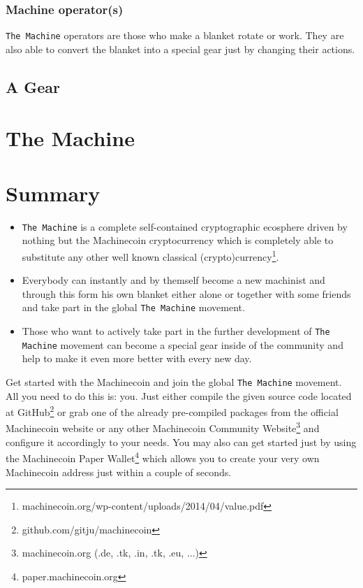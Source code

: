 \documentclass{beamer}
\newcommand{\gear}[8]{%
  \foreach \i in {1,...,#1} {%
    [rotate=(\i-1)*360/#1]  (0:#2)  arc (0:#4:#2) {[rounded corners=2pt]
     -- (#4+#5:#3)  arc (#4+#5:360/#1-#5:#3)} --  (360/#1:#2)
  }%
  (0,0) circle[radius=#6]
  (0,0) circle[radius=#7];
\draw[thick,xshift=#8]
\foreach \i in {1,2,...,36} {%
  [rotate=(\i-1)*10]  (0.0,#6) -- (0.0,#7)
};
}
\begin{document}
\subsubsection{Machine operator(s)}
\frame
{
\texttt{The Machine} operators are those who make a blanket rotate or work. They are also able to convert the blanket into a special gear just by changing their actions.
\newline
{}
}

\subsection{A Gear}
\frame
{

}

\section{The Machine}
\frame
{

}

\section{Summary}
\frame
{
\begin{itemize}
\item{\texttt{The Machine} is a complete self-contained cryptographic ecosphere driven by nothing but the Machinecoin cryptocurrency which is completely able to substitute any other well known classical (crypto)currency\footnote{machinecoin.org/wp-content/uploads/2014/04/value.pdf}.}
\item{Everybody can instantly and by themself become a new machinist and through this form his own blanket either alone or together with some friends and take part in the global \texttt{The Machine} movement.}
\item{Those who want to actively take part in the further development of \texttt{The Machine} movement can become a special gear inside of the community and help to make it even more better with every new day.}
\end{itemize}
}
\frame
{
Get started with the Machinecoin and join the global \texttt{The Machine} movement. All you need to do this is: you. Just either compile the given source code located at GitHub\footnote{github.com/gitju/machinecoin} or grab one of the already pre-compiled packages from the official Machinecoin website or any other Machinecoin Community Website\footnote{machinecoin.org (.de, .tk, .in, .tk, .eu, ...)} and configure it accordingly to your needs. You may also can get started just by using the Machinecoin Paper Wallet\footnote{paper.machinecoin.org} which allows you to create your very own Machinecoin address just within a couple of seconds. 
}

%	
%			
\end{document}
